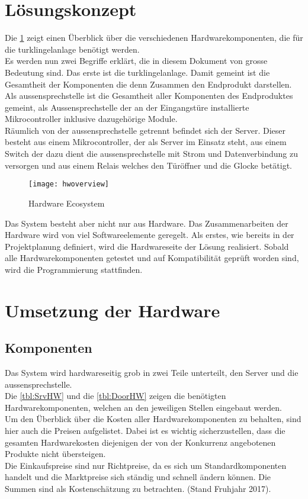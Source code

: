 \section{Lösungskonzept}
\label{sec:lösungskonzept}
Die \cref{fig:hwoverview} zeigt einen Überblick über die verschiedenen Hardwarekomponenten, die für die \gls{turklingelanlage} benötigt werden.
\\
Es werden nun zwei Begriffe erklärt, die in diesem Dokument von grosse Bedeutung sind. Das erste ist die \gls{turklingelanlage}. Damit gemeint ist die Gesamtheit der Komponenten die denn Zusammen den Endprodukt darstellen.
\\
Als \gls{aussensprechstelle} ist die Gesamtheit aller Komponenten des Endproduktes gemeint, als Aussensprechstelle der an der Eingangstüre installierte Mikrocontroller inklusive dazugehörige Module.
\\
Räumlich von der \gls{aussensprechstelle} getrennt befindet sich der Server. Dieser besteht aus einem Mikrocontroller, der als Server im Einsatz steht, aus einem Switch der dazu dient die \gls{aussensprechstelle} mit Strom und Datenverbindung zu versorgen und aus einem Relais welches den Türöffner und die Glocke betätigt.
\begin{figure}[htb!]
	\begin{center}
		\texttt{[image: hwoverview]}
		\caption[Hardware Ecosystem]{Hardware Ecosystem}
		\label{fig:hwoverview}
	\end{center}
\end{figure}
Das System besteht aber nicht nur aus Hardware. Das Zusammenarbeiten der Hardware wird von viel Softwareelemente geregelt. Als erstes, wie bereits in der Projektplanung definiert, wird die Hardwareseite der Lösung realisiert. Sobald alle Hardwarekomponenten getestet und auf Kompatibilität geprüft worden sind, wird die Programmierung stattfinden.
\newpage

\section{Umsetzung der Hardware}
\label{sec:chapterexample}
\subsection{Komponenten}
Das System wird hardwareseitig grob in zwei Teile unterteilt, den Server und die \gls{aussensprechstelle}.
\\
Die \cref{tbl:SrvHW} und die \cref{tbl:DoorHW} zeigen die benötigten Hardwarekomponenten, welchen an den jeweiligen Stellen eingebaut werden.
\\
Um den Überblick über die Kosten aller Hardwarekomponenten zu behalten, sind hier auch die Preisen aufgelistet. Dabei ist es wichtig sicherzustellen, dass die gesamten Hardwarekosten diejenigen der von der Konkurrenz angebotenen Produkte nicht übersteigen.
\\
Die Einkaufspreise sind nur Richtpreise, da es sich um Standardkomponenten handelt und die Marktpreise sich ständig und schnell ändern können. Die Summen sind als Kostenschätzung zu betrachten. (Stand Fruhjahr 2017).

